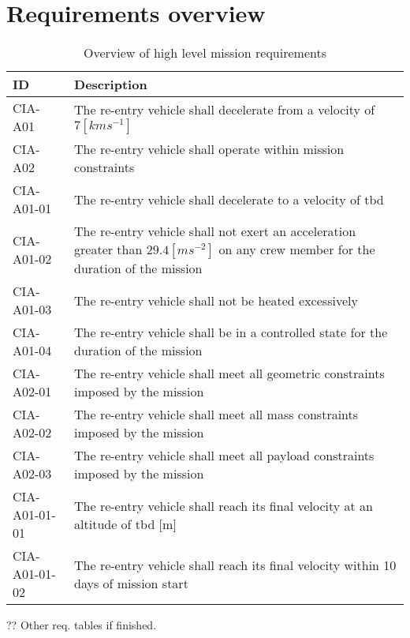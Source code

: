 \section{Requirements overview} \label{app:req}

\begin{table}[H]

	\caption*{Overview of high level mission requirements}
	\begin{tabular}{|p{}|p{}|}
    \hline
    ID          & Description                                                                                                      \\ \hline \hline
    CIA-A01 & The re-entry vehicle shall decelerate from a velocity of $7[kms^{-1}]$ \\ \hline
    CIA-A02 & The re-entry vehicle shall operate within mission constraints                                               \\ \hline
    CIA-A01-01 & The re-entry vehicle shall decelerate to a velocity of \gls{tbd}     \\ \hline
    CIA-A01-02 & The re-entry vehicle shall not exert an acceleration greater than $29.4 [ms^{-2}]$ on any crew member for the duration of the mission			\\ \hline
    CIA-A01-03 & The re-entry vehicle shall not be heated excessively  \\ \hline
    CIA-A01-04 & The re-entry vehicle shall be in a controlled state for the duration of the mission                            \\ \hline
    CIA-A02-01 & The re-entry vehicle shall meet all geometric constraints imposed by the mission                           \\ \hline
    CIA-A02-02 & The re-entry vehicle shall meet all mass constraints imposed by the mission                                      \\ \hline
	CIA-A02-03 & The re-entry vehicle shall meet all payload constraints imposed by the mission \\ \hline
	CIA-A01-01-01 & The re-entry vehicle shall reach its final velocity at an altitude of \gls{tbd} [m] \\ \hline
	CIA-A01-01-02 & The re-entry vehicle shall reach its final velocity within 10 days of mission start \\ \hline
    \end{tabular}
\end{table}


?? Other req. tables if finished.